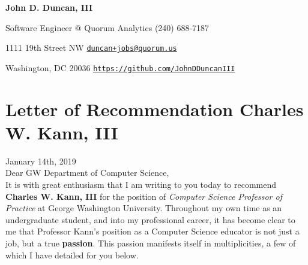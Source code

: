\documentclass[11pt]{article}
\begin{document}
\fancyfoot{}
\pagestyle{fancy}
\thispagestyle{empty}
\renewcommand{\headrulewidth}{0pt}
\renewcommand{\footrulewidth}{0pt}

\begin{center}
	{\huge \textbf{John D. Duncan, III}}
\end{center}
Software Engineer @ Quorum Analytics
\hfill
(240) 688-7187

1111 19th Street NW
\hfill
\texttt{\href{mailto:duncan+jobs@quorum.us}{duncan+jobs@quorum.us}}

Washington, DC 20036 \hfill \texttt{\url{https://github.com/JohnDDuncanIII}}
\hfill

\section*{Letter of Recommendation \hfill Charles W. Kann, III}

January 14th, 2019\\

Dear GW Department of Computer Science,\\

It is with great enthusiasm that I am writing to you today to recommend \textbf{Charles W. Kann, III} for the position of \textit{Computer Science Professor of Practice} at George Washington University. Throughout my own time as an undergraduate student, and into my professional career, it has become clear to me that Professor Kann's position as a Computer Science educator is not just a job, but a true \textbf{passion}. This passion manifests itself in multiplicities, a few of which I have detailed for you below.
\end{document}
